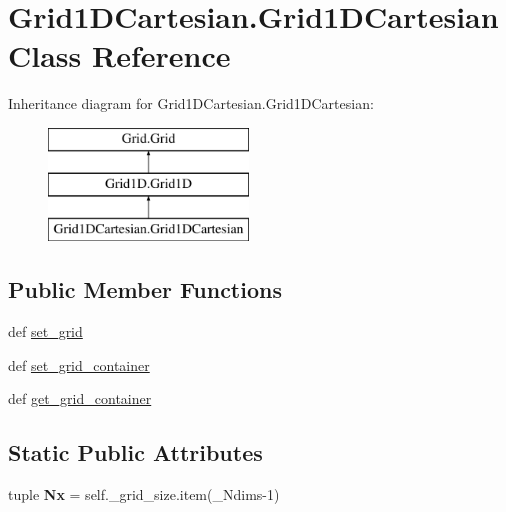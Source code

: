 \hypertarget{classGrid1DCartesian_1_1Grid1DCartesian}{\section{Grid1\-D\-Cartesian.\-Grid1\-D\-Cartesian Class Reference}
\label{classGrid1DCartesian_1_1Grid1DCartesian}
}
Inheritance diagram for Grid1\-D\-Cartesian.\-Grid1\-D\-Cartesian\-:\begin{figure}[H]
\begin{center}
\leavevmode
\includegraphics[height=3.000000cm]{classGrid1DCartesian_1_1Grid1DCartesian}
\end{center}
\end{figure}
\subsection*{Public Member Functions}
\begin{DoxyCompactItemize}
\item 
def \hyperlink{classGrid1DCartesian_1_1Grid1DCartesian_a7aa69514393f49e62b5b6e52474bba66}{set\-\_\-grid}
\item 
def \hyperlink{classGrid1DCartesian_1_1Grid1DCartesian_ab65433172dcaf48d7e5b70bf8efe0c6f}{set\-\_\-grid\-\_\-container}
\item 
def \hyperlink{classGrid1DCartesian_1_1Grid1DCartesian_a54f1f22b80717d8f6a809a6a9f3c649b}{get\-\_\-grid\-\_\-container}
\end{DoxyCompactItemize}
\subsection*{Static Public Attributes}
\begin{DoxyCompactItemize}
\item 
\hypertarget{classGrid1DCartesian_1_1Grid1DCartesian_a9102b7faba7f5dc99f952e870d5149ea}{tuple {\bfseries Nx} = self.\-\_\-grid\-\_\-size.\-item(\-\_\-\-Ndims-\/1)}\label{classGrid1DCartesian_1_1Grid1DCartesian_a9102b7faba7f5dc99f952e870d5149ea}

\end{DoxyCompactItemize}


